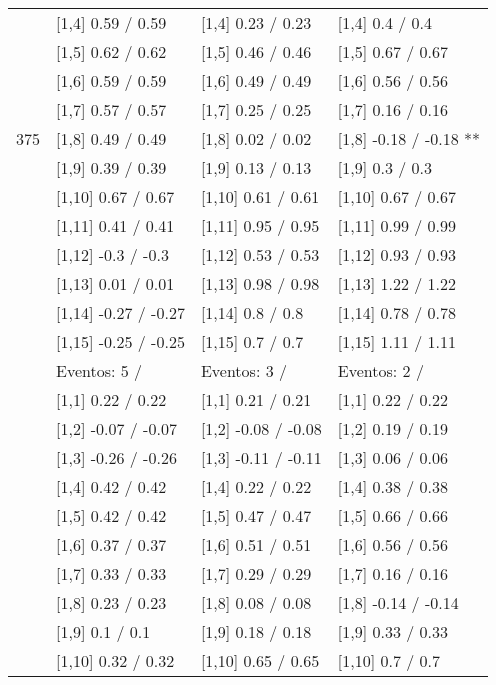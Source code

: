 \begin{table}
\begin{tabular}[t]{llll}
\addlinespace
 & {}[1,4] 0.59  / 0.59 & {}[1,4] 0.23  / 0.23 & {}[1,4] 0.4  / 0.4\\
 & {}[1,5] 0.62  / 0.62 & {}[1,5] 0.46  / 0.46 & {}[1,5] 0.67  / 0.67\\
 & {}[1,6] 0.59  / 0.59 & {}[1,6] 0.49  / 0.49 & {}[1,6] 0.56  / 0.56\\
 & {}[1,7] 0.57  / 0.57 & {}[1,7] 0.25  / 0.25 & {}[1,7] 0.16  / 0.16\\
375 & {}[1,8] 0.49  / 0.49 & {}[1,8] 0.02  / 0.02 & {}[1,8] -0.18  / -0.18 **\\
\addlinespace
 & {}[1,9] 0.39  / 0.39 & {}[1,9] 0.13  / 0.13 & {}[1,9] 0.3  / 0.3\\
 & {}[1,10] 0.67  / 0.67 & {}[1,10] 0.61  / 0.61 & {}[1,10] 0.67  / 0.67\\
 & {}[1,11] 0.41  / 0.41 & {}[1,11] 0.95  / 0.95 & {}[1,11] 0.99  / 0.99\\
 & {}[1,12] -0.3  / -0.3 & {}[1,12] 0.53  / 0.53 & {}[1,12] 0.93  / 0.93\\
 & {}[1,13] 0.01  / 0.01 & {}[1,13] 0.98  / 0.98 & {}[1,13] 1.22  / 1.22\\
\addlinespace
 & {}[1,14] -0.27  / -0.27 & {}[1,14] 0.8  / 0.8 & {}[1,14] 0.78  / 0.78\\
 & {}[1,15] -0.25  / -0.25 & {}[1,15] 0.7  / 0.7 & {}[1,15] 1.11  / 1.11\\
 & Eventos:  5 / & Eventos:  3 / & Eventos:  2 /\\
 & {}[1,1] 0.22  / 0.22 & {}[1,1] 0.21  / 0.21 & {}[1,1] 0.22  / 0.22\\
 & {}[1,2] -0.07  / -0.07 & {}[1,2] -0.08  / -0.08 & {}[1,2] 0.19  / 0.19\\
\addlinespace
 & {}[1,3] -0.26  / -0.26 & {}[1,3] -0.11  / -0.11 & {}[1,3] 0.06  / 0.06\\
 & {}[1,4] 0.42  / 0.42 & {}[1,4] 0.22  / 0.22 & {}[1,4] 0.38  / 0.38\\
 & {}[1,5] 0.42  / 0.42 & {}[1,5] 0.47  / 0.47 & {}[1,5] 0.66  / 0.66\\
 & {}[1,6] 0.37  / 0.37 & {}[1,6] 0.51  / 0.51 & {}[1,6] 0.56  / 0.56\\
 & {}[1,7] 0.33  / 0.33 & {}[1,7] 0.29  / 0.29 & {}[1,7] 0.16  / 0.16\\
\addlinespace
500 & {}[1,8] 0.23  / 0.23 & {}[1,8] 0.08  / 0.08 & {}[1,8] -0.14  / -0.14\\
 & {}[1,9] 0.1  / 0.1 & {}[1,9] 0.18  / 0.18 & {}[1,9] 0.33  / 0.33\\
 & {}[1,10] 0.32  / 0.32 & {}[1,10] 0.65  / 0.65 & {}[1,10] 0.7  / 0.7\\

\end{tabular}
\end{table}
